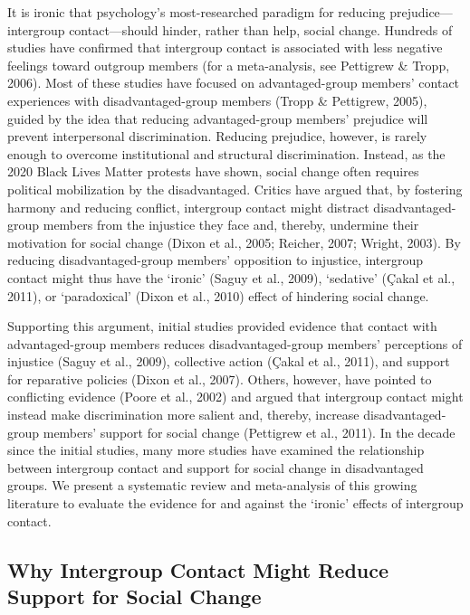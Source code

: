 \documentclass[12pt, letterpaper]{article}
\begin{document}
It is ironic that psychology's most-researched paradigm for reducing
prejudice---intergroup contact---should hinder, rather than help, social
change. Hundreds of studies have confirmed that intergroup contact is
associated with less negative feelings toward outgroup members (for a
meta-analysis, see Pettigrew \& Tropp, 2006). Most of these studies have
focused on advantaged-group members' contact experiences with
disadvantaged-group members (Tropp \& Pettigrew, 2005), guided by the
idea that reducing advantaged-group members' prejudice will prevent
interpersonal discrimination. Reducing prejudice, however, is rarely
enough to overcome institutional and structural discrimination. Instead,
as the 2020 Black Lives Matter protests have shown, social change often
requires political mobilization by the disadvantaged. Critics have
argued that, by fostering harmony and reducing conflict, intergroup
contact might distract disadvantaged-group members from the injustice
they face and, thereby, undermine their motivation for social change
(Dixon et al., 2005; Reicher, 2007; Wright, 2003). By reducing
disadvantaged-group members' opposition to injustice, intergroup contact
might thus have the `ironic' (Saguy et al., 2009), `sedative' (Çakal et
al., 2011), or `paradoxical' (Dixon et al., 2010) effect of hindering
social change.

Supporting this argument, initial studies provided evidence that contact
with advantaged-group members reduces disadvantaged-group members'
perceptions of injustice (Saguy et al., 2009), collective action (Çakal
et al., 2011), and support for reparative policies (Dixon et al., 2007).
Others, however, have pointed to conflicting evidence (Poore et al.,
2002) and argued that intergroup contact might instead make
discrimination more salient and, thereby, increase disadvantaged-group
members' support for social change (Pettigrew et al., 2011). In the
decade since the initial studies, many more studies have examined the
relationship between intergroup contact and support for social change in
disadvantaged groups. We present a systematic review and meta-analysis
of this growing literature to evaluate the evidence for and against the
`ironic' effects of intergroup contact.

\hypertarget{why-intergroup-contact-might-reduce-support-for-social-change}{%
\subsection{Why Intergroup Contact Might Reduce Support for Social
Change}\label{why-intergroup-contact-might-reduce-support-for-social-change}}
\end{document}
